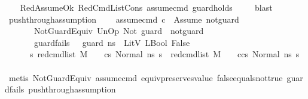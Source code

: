 \begin{isabellebody}
%
\isadelimproof
\ \ %
\endisadelimproof
%
\isatagproof
{}\isamarkupfalse%
\ RedAssumeOk\ RedCmdListCons\ assume{\isacharunderscore}{\kern0pt}cmd\ guard{\isacharunderscore}{\kern0pt}holds\ \isanewline
\ \ \isamarkupfalse%
\ blast%
\endisatagproof
{\isafoldproof}%
%
\isadelimproof
\isanewline
%
\endisadelimproof
\isanewline
{}\isamarkupfalse%
\ push{\isacharunderscore}{\kern0pt}through{\isacharunderscore}{\kern0pt}assumption{}{\isacharcolon}{\kern0pt}\ \isanewline
\ \ \ assume{\isacharunderscore}{\kern0pt}cmd{\isacharcolon}{\kern0pt}\ {\isachardoublequoteopen}c\ {\isacharequal}{\kern0pt}\ Assume\ not{\isacharunderscore}{\kern0pt}guard{\isachardoublequoteclose}\isanewline
\ \ \ \ \ \ \ NotGuardEquiv{\isacharcolon}{\kern0pt}\ {\isachardoublequoteopen}UnOp\ Not\ guard\ {\isasymsim}\ not{\isacharunderscore}{\kern0pt}guard{\isachardoublequoteclose}\isanewline
\ \ \ \ \ \ \ guard{\isacharunderscore}{\kern0pt}fails{\isacharcolon}{\kern0pt}\ {\isachardoublequoteopen}{\isasymLambda}{\isacharcomma}{\kern0pt}{\isasymGamma}{\isacharcomma}{\kern0pt}{\isasymOmega}\ {\isasymturnstile}\ {\isasymlangle}guard{\isacharcomma}{\kern0pt}\ ns{}{\isasymrangle}\ {\isasymDown}\ LitV\ {\isacharparenleft}{\kern0pt}LBool\ False{\isacharparenright}{\kern0pt}{\isachardoublequoteclose}\isanewline
\ \ \ \ \ {\isachardoublequoteopen}{\isasymAnd}\ s{\isachardot}{\kern0pt}\ {\isacharparenleft}{\kern0pt}red{\isacharunderscore}{\kern0pt}cmd{\isacharunderscore}{\kern0pt}list\ M\ {\isasymLambda}\ {\isasymGamma}\ {\isasymOmega}\ {\isacharparenleft}{\kern0pt}cs{}{\isacharparenright}{\kern0pt}\ {\isacharparenleft}{\kern0pt}Normal\ ns{}{\isacharparenright}{\kern0pt}\ s{\isacharparenright}{\kern0pt}\ {\isasymLongrightarrow}\ {\isacharparenleft}{\kern0pt}red{\isacharunderscore}{\kern0pt}cmd{\isacharunderscore}{\kern0pt}list\ M\ {\isasymLambda}\ {\isasymGamma}\ {\isasymOmega}\ {\isacharparenleft}{\kern0pt}c{\isacharhash}{\kern0pt}cs{}{\isacharparenright}{\kern0pt}\ {\isacharparenleft}{\kern0pt}Normal\ ns{}{\isacharparenright}{\kern0pt}\ s{\isacharparenright}{\kern0pt}{\isachardoublequoteclose}\isanewline
%
\isadelimproof
\ \ %
\endisadelimproof
%
\isatagproof
{}\isamarkupfalse%
\ {\isacharparenleft}{\kern0pt}metis\ NotGuardEquiv\ assume{\isacharunderscore}{\kern0pt}cmd\ equiv{\isacharunderscore}{\kern0pt}preserves{\isacharunderscore}{\kern0pt}value\ false{\isacharunderscore}{\kern0pt}equals{\isacharunderscore}{\kern0pt}not{\isacharunderscore}{\kern0pt}true\ guard{\isacharunderscore}{\kern0pt}fails\ push{\isacharunderscore}{\kern0pt}through{\isacharunderscore}{\kern0pt}assumption{}{\isacharparenright}{\kern0pt}%

\end{isabellebody}
